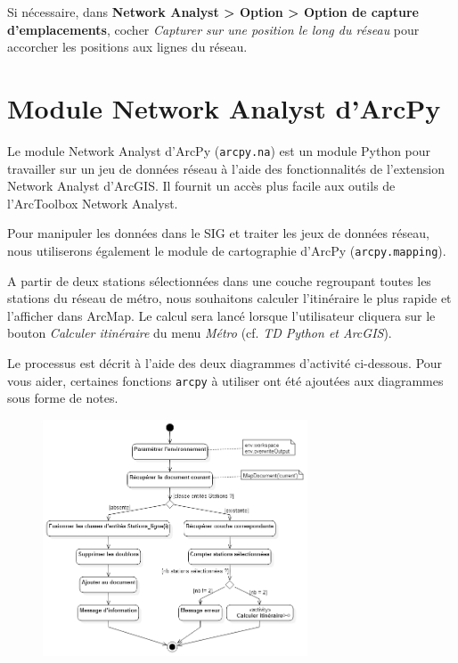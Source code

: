 \documentclass[11pt]{article}
\begin{document}
Si nécessaire, dans \textbf{Network Analyst > Option > Option de capture d'emplacements}, cocher \textit{Capturer sur une position le long du réseau} pour accorcher les positions aux lignes du réseau.


\section{Module Network Analyst d'ArcPy}

Le module Network Analyst d'ArcPy (\texttt{arcpy.na}) est un module Python pour travailler sur un jeu de données réseau à l'aide des fonctionnalités de l'extension Network Analyst d'ArcGIS. Il fournit un accès plus facile aux outils de l'ArcToolbox Network Analyst.

Pour manipuler les données dans le SIG et traiter les jeux de données réseau, nous utiliserons également le module de cartographie d'ArcPy (\texttt{arcpy.mapping}).

A partir de deux stations sélectionnées dans une couche regroupant toutes les stations du réseau de métro, nous souhaitons calculer l'itinéraire le plus rapide et l'afficher dans ArcMap. Le calcul sera lancé lorsque l'utilisateur cliquera sur le bouton \textit{Calculer itinéraire} du menu \textit{Métro} (cf. \textit{TD Python et ArcGIS}).

Le processus est décrit à l'aide des deux diagrammes d'activité ci-dessous. Pour vous aider, certaines fonctions \texttt{arcpy} à utiliser ont été ajoutées aux diagrammes sous forme de notes. 

\begin{figure}[H]
	\center \includegraphics[width=0.7\textwidth]{img/td3b/diagramme_activite_general.png} \\
\end{figure}
\end{document}
